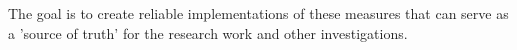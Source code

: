 \documentclass[preview]{standalone}
\begin{document}
The goal is to create reliable implementations of these measures that can serve as a 'source of truth' for the research work and other investigations.\\
\end{document}

